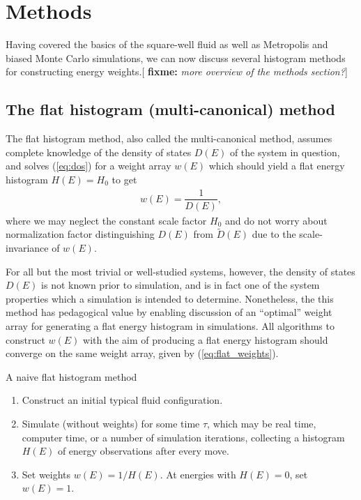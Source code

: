 \documentclass[11pt]{article}
\newcommand{\f}[2]{\dfrac{#1}{#2}} %
\newcommand{\p}[1]{\left(#1\right)} %
\newenvironment{alg}
{\hrulefill\begin{enumerate}}
{\end{enumerate}\hrulefill}
\newcommand{\red}[1]{{\bf \color{red} #1}}
\newcommand{\fixme}[1]{[\red{fixme:} \emph{#1}]}
\begin{document}
\section{Methods}
\label{sec:methods}

Having covered the basics of the square-well fluid as well as
Metropolis and biased Monte Carlo simulations, we can now discuss
several histogram methods for constructing energy weights.\fixme{more
  overview of the methods section?}

\subsection{The flat histogram (multi-canonical) method}
\label{sec:flat_histogram}

The flat histogram method, also called the multi-canonical method,
assumes complete knowledge of the density of states $D\p{E}$ of the
system in question, and solves (\ref{eq:dos}) for a weight array
$w\p{E}$ which should yield a flat energy histogram $H\p E=H_0$ to get
\begin{align}
  w\p E=\f1{D\p E},
  \label{eq:flat_weights}
\end{align}
where we may neglect the constant scale factor $H_0$ and do not worry
about normalization factor distinguishing $D\p{E}$ from $\tilde
D\p{E}$ due to the scale-invariance of $w\p{E}$.

For all but the most trivial or well-studied systems, however, the
density of states $D\p{E}$ is not known prior to simulation, and is in
fact one of the system properties which a simulation is intended to
determine. Nonetheless, the this method has pedagogical value by
enabling discussion of an ``optimal'' weight array for generating a
flat energy histogram in simulations. All algorithms to construct
$w\p{E}$ with the aim of producing a flat energy histogram should
converge on the same weight array, given by (\ref{eq:flat_weights}).

\begin{algorithm}[b]
  \caption{A naive flat histogram method}
  \label{alg:flat_histogram}
  \begin{alg}

  \item Construct an initial typical fluid configuration.

  \item Simulate (without weights) for some time $\tau$, which may be
    real time, computer time, or a number of simulation iterations,
    collecting a histogram $H\p{E}$ of energy observations after every
    move.

  \item Set weights $w\p{E}=1/H\p{E}$. At energies with $H\p{E}=0$,
    set $w\p{E}=1$.

  \end{alg}
\end{algorithm}
\end{document}
